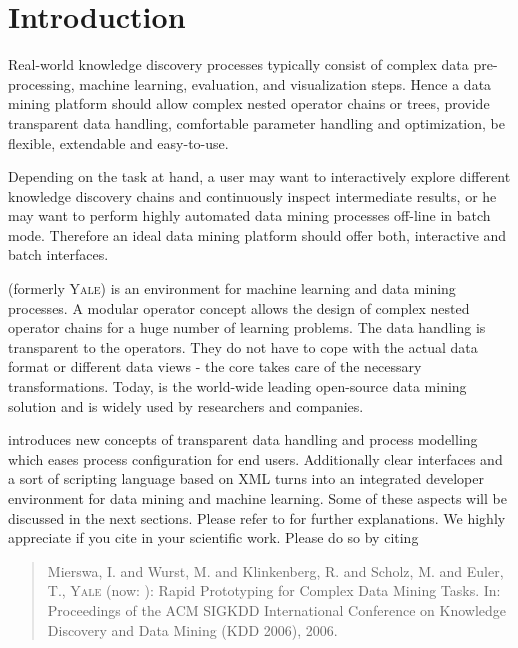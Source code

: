 \chapter{Introduction}

   Real-world knowledge discovery processes typically consist
of complex data pre-processing, machine learning, evaluation,
and visualization steps. 
   Hence a data mining platform should allow complex nested 
operator chains or trees, provide transparent data handling, 
comfortable parameter handling and optimization, be flexible, 
extendable and easy-to-use.

   Depending on the task at hand, a user may want to interactively
explore different knowledge discovery chains and continuously 
inspect intermediate results, or he may want to perform highly 
automated data mining processes off-line in batch mode.
   Therefore an ideal data mining platform should offer both,
interactive and batch interfaces.

\rapidminer (formerly \textsc{Yale}) is an environment for machine learning and data mining processes. A modular operator
concept allows the design of complex nested operator chains for a huge number
of learning problems. The data handling is transparent to the operators. They
do not have to cope with the actual data format or different data views - the
\rapidminer core takes care of the necessary transformations. Today, \rapidminer is the 
world-wide leading open-source data mining solution and is widely used by
researchers and companies.

\rapidminer introduces new concepts of transparent data handling and process
modelling which eases process configuration for end users. Additionally
clear interfaces and a sort of scripting language based on XML turns \rapidminer
into an integrated developer environment for data mining and machine learning.
Some of these aspects will be discussed in the next sections. Please
refer to \cite{Mierswa/etal/2006a,Mierswa/etal/2003a,Ritthoff/etal/2001a} for further
explanations. We highly appreciate if you cite \rapidminer in your scientific work. 
Please do so by citing

\begin{quote}
Mierswa, I. and Wurst, M. and Klinkenberg, R. and Scholz, M. and Euler, T.,
\textsc{Yale} (now: \rapidminer): Rapid Prototyping for Complex Data Mining Tasks. In: Proceedings of the ACM SIGKDD
International Conference on Knowledge Discovery and Data Mining (KDD 2006), 2006.
\end{quote}


